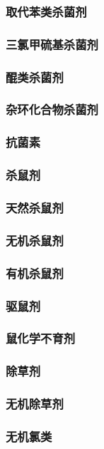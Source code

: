 \documentclass[UTF8]{../../ApplicationUniverse}
\begin{document}
        \subsubsection{取代苯类杀菌剂}
        \subsubsection{三氯甲硫基杀菌剂}
        \subsubsection{醌类杀菌剂}
        \subsubsection{杂环化合物杀菌剂}
    \subsubsection{抗菌素}
\subsubsection{杀鼠剂}
    \subsubsection{天然杀鼠剂}
    \subsubsection{无机杀鼠剂}
    \subsubsection{有机杀鼠剂}
    \subsubsection{驱鼠剂}
    \subsubsection{鼠化学不育剂}
\subsubsection{除草剂}
    \subsubsection{无机除草剂}
        \subsubsection{无机氯类}
\end{document}

